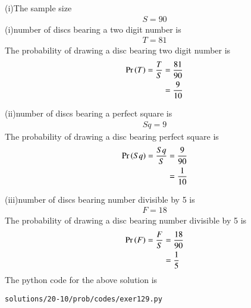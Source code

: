 (i)The sample size 
\begin{align}
S=90
\end{align}
(i)number of discs bearing a two digit number is 
\begin{align}
T=81
\end{align}
The probability of drawing a disc bearing two digit number is 
\begin{align}
\Pr\left(T\right) = \frac{T}{S} &= \frac{81}{90}
\\
&= \frac{9}{10}
\end{align}

(ii)number of discs bearing a perfect square is 
\begin{align}
Sq=9
\end{align}
The probability of drawing a disc bearing perfect square is 
\begin{align}
\Pr\left(Sq\right) = \frac{Sq}{S} &= \frac{9}{90}
\\
&= \frac{1}{10}
\end{align}

(iii)number of discs bearing number divisible by 5 is 
\begin{align}
F=18
\end{align}
The probability of drawing a disc bearing number divisible by 5 is 
\begin{align}
\Pr\left(F\right) = \frac{F}{S} &= \frac{18}{90}
\\
&= \frac{1}{5}
\end{align}
The python code for the above solution is
\begin{lstlisting}
solutions/20-10/prob/codes/exer129.py
\end{lstlisting}
